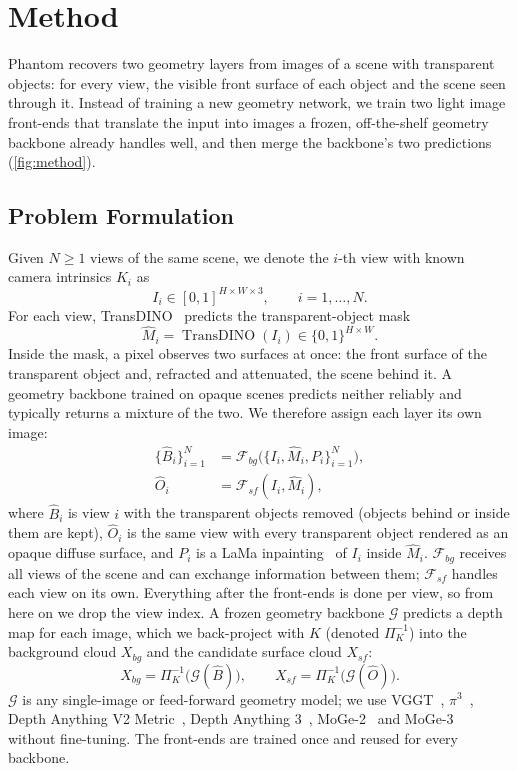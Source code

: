 \section{Method}
\label{sec:method}

Phantom recovers two geometry layers from images of a scene with transparent objects: for every view, the visible front surface of each object and the scene seen through it.
Instead of training a new geometry network, we train two light image front-ends that translate the input into images a frozen, off-the-shelf geometry backbone already handles well, and then merge the backbone's two predictions (\cref{fig:method}).

\subsection{Problem Formulation}
\label{sec:formulation}

Given $N \ge 1$ views of the same scene, we denote the $i$-th view with known camera intrinsics $K_i$ as
\[
  I_i \in [0,1]^{H \times W \times 3}, \qquad i=1,\ldots,N.
\]
For each view, TransDINO~\cite{ghost} predicts the transparent-object mask
\[
  \hat M_i = \operatorname{TransDINO}(I_i) \in \{0,1\}^{H \times W}.
\]
Inside the mask, a pixel observes two surfaces at once: the front surface of the transparent object and, refracted and attenuated, the scene behind it.
A geometry backbone trained on opaque scenes predicts neither reliably and typically returns a mixture of the two.
We therefore assign each layer its own image:
\begin{equation}
  \begin{aligned}
  \{\hat B_i\}_{i=1}^{N} &= \mathcal{F}_{bg}\big(\{I_i, \hat M_i, P_i\}_{i=1}^{N}\big), \\
  \hat O_i &= \mathcal{F}_{sf}(I_i, \hat M_i),
  \end{aligned}
  \label{eq:frontends}
\end{equation}
where $\hat B_i$ is view $i$ with the transparent objects removed (objects behind or inside them are kept), $\hat O_i$ is the same view with every transparent object rendered as an opaque diffuse surface, and $P_i$ is a LaMa inpainting~\cite{lama} of $I_i$ inside $\hat M_i$.
$\mathcal{F}_{bg}$ receives all views of the scene and can exchange information between them; $\mathcal{F}_{sf}$ handles each view on its own.
Everything after the front-ends is done per view, so from here on we drop the view index.
A frozen geometry backbone $\mathcal{G}$ predicts a depth map for each image, which we back-project with $K$ (denoted $\Pi_K^{-1}$) into the background cloud $X_{bg}$ and the candidate surface cloud $X_{sf}$:
\begin{equation}
  X_{bg} = \Pi_K^{-1}\big(\mathcal{G}(\hat B)\big), \qquad X_{sf} = \Pi_K^{-1}\big(\mathcal{G}(\hat O)\big).
  \label{eq:backbone}
\end{equation}
$\mathcal{G}$ is any single-image or feed-forward geometry model; we use VGGT~\cite{vggt}, $\pi^3$~\cite{pi3}, Depth Anything V2 Metric~\cite{dav2}, Depth Anything 3~\cite{da3}, MoGe-2~\cite{moge2} and MoGe-3~\cite{moge3} without fine-tuning.
The front-ends are trained once and reused for every backbone.

